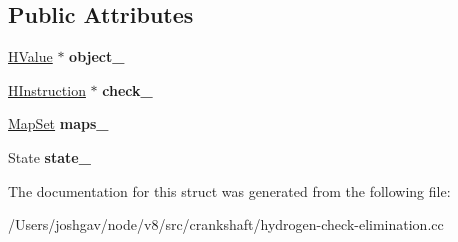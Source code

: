 \subsection*{Public Attributes}
\begin{DoxyCompactItemize}
\item 
\hyperlink{classv8_1_1internal_1_1_h_value}{H\+Value} $\ast$ {\bfseries object\+\_\+}\hypertarget{structv8_1_1internal_1_1_h_check_table_entry_af33fccf20bac5b13cdbc90dee9d46fa2}{}\label{structv8_1_1internal_1_1_h_check_table_entry_af33fccf20bac5b13cdbc90dee9d46fa2}

\item 
\hyperlink{classv8_1_1internal_1_1_h_instruction}{H\+Instruction} $\ast$ {\bfseries check\+\_\+}\hypertarget{structv8_1_1internal_1_1_h_check_table_entry_a7e3ebe8f88b340e06aa12de4150a2462}{}\label{structv8_1_1internal_1_1_h_check_table_entry_a7e3ebe8f88b340e06aa12de4150a2462}

\item 
\hyperlink{classv8_1_1internal_1_1_unique_set}{Map\+Set} {\bfseries maps\+\_\+}\hypertarget{structv8_1_1internal_1_1_h_check_table_entry_ac07a54376511e4f3fa9c6d3aa378a668}{}\label{structv8_1_1internal_1_1_h_check_table_entry_ac07a54376511e4f3fa9c6d3aa378a668}

\item 
State {\bfseries state\+\_\+}\hypertarget{structv8_1_1internal_1_1_h_check_table_entry_ab4d54ec65ca1ff7456078a4710abd115}{}\label{structv8_1_1internal_1_1_h_check_table_entry_ab4d54ec65ca1ff7456078a4710abd115}

\end{DoxyCompactItemize}


The documentation for this struct was generated from the following file\+:\begin{DoxyCompactItemize}
\item 
/\+Users/joshgav/node/v8/src/crankshaft/hydrogen-\/check-\/elimination.\+cc\end{DoxyCompactItemize}
